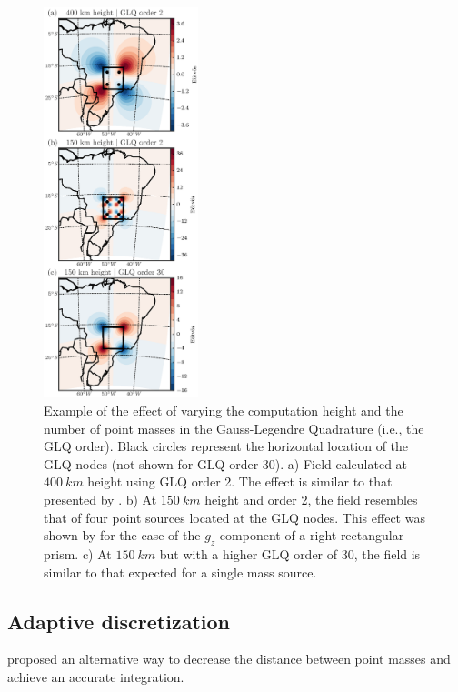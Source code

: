 \documentclass[manuscript]{geophysics}
\begin{document}
\begin{figure}
    \centering
    \includegraphics[width=0.4\textwidth]{figs/vary-height-and-order}
    \caption{
        Example of the effect of varying
        the computation height
        and the number of point masses in the Gauss-Legendre Quadrature
        (i.e., the GLQ order).
        Black circles represent the horizontal location of the GLQ nodes
        (not shown for GLQ order 30).
        a) Field calculated at $400\ km$ height using GLQ order 2.
        The effect is similar to that presented by \citet{Asgharzadeh2007}.
        b) At $150\ km$ height and order 2,
        the field resembles that of
        four point sources located at the GLQ nodes.
        This effect was shown by \citet{Ku1977}
        for the case of the $g_z$ component of a right rectangular prism.
        c) At $150\ km$ but with a higher GLQ order of 30,
        the field is similar to that expected for a single mass source.
    }
    \label{fig:glqerrorsample}
\end{figure}


\subsection{Adaptive discretization}


\citet{Li2011} proposed an alternative way to decrease the distance between
point masses and achieve an accurate integration.
\end{document}
